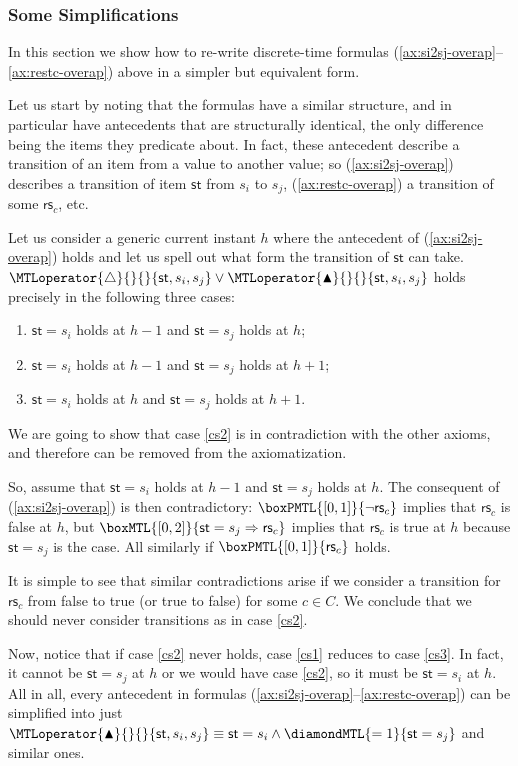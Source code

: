 \documentclass[a4paper]{article}
\newcommand{\frf}[1]{(\ref{#1})}
\newcommand{\fsrf}[2]{(\ref{#1}--\ref{#2})}
\newcommand{\st}{\mathsf{st}}
\newcommand{\rest}[1]{\mathsf{rs}_{#1}}
\newcommand{\becomesMTL}[1]{\MTLoperator{\triangle}{}{}{#1}}
\newcommand{\becomesOMTL}[1]{\MTLoperator{\blacktriangle}{}{}{#1}}
\theoremstyle{plain}
\theoremstyle{definition}
\begin{document}
\subsubsection{Some Simplifications}
In this section we show how to re-write discrete-time formulas \fsrf{ax:si2sj-overap}{ax:restc-overap} above in a simpler but equivalent form.

Let us start by noting that the formulas have a similar structure, and in particular have antecedents that are structurally identical, the only difference being the items they predicate about.
In fact, these antecedent describe a transition of an item from a value to another value; so \frf{ax:si2sj-overap} describes a transition of item $\st$ from $s_i$ to $s_j$, \frf{ax:restc-overap} a transition of some $\rest{c}$, etc.

Let us consider a generic current instant $h$ where the antecedent of \frf{ax:si2sj-overap} holds and let us spell out what form the transition of $\st$ can take.
$\becomesMTL{\st, s_i, s_j} \vee \becomesOMTL{\st, s_i, s_j}$ holds precisely in the following three cases:
\begin{enumerate}
  \item \label{cs2} $\st = s_i$ holds at $h-1$ and $\st = s_j$ holds at $h$;
  \item \label{cs1} $\st = s_i$ holds at $h-1$ and $\st = s_j$ holds at $h+1$;
  \item \label{cs3} $\st = s_i$ holds at $h$ and $\st = s_j$ holds at $h+1$.
\end{enumerate}
We are going to show that case \ref{cs2} is in contradiction with the other axioms, and therefore can be removed from the axiomatization.

So, assume that $\st = s_i$ holds at $h-1$ and $\st = s_j$ holds at $h$.
The consequent of \frf{ax:si2sj-overap} is then contradictory: $\boxPMTL{[0,1]}{\neg \rest{c}}$ implies that $\rest{c}$ is false at $h$, but $\boxMTL{[0,2]}{\st = s_j \Rightarrow \rest{c}}$ implies that $\rest{c}$ is true at $h$ because $\st = s_j$ is the case.
All similarly if $\boxPMTL{[0,1]}{\rest{c}}$ holds.

It is simple to see that similar contradictions arise if we consider a transition for $\rest{c}$ from false to true (or true to false) for some $c \in C$.
We conclude that we should never consider transitions as in case \ref{cs2}.

Now, notice that if case \ref{cs2} never holds, case \ref{cs1} reduces to case \ref{cs3}.
In fact, it cannot be $\st = s_j$ at $h$ or we would have case \ref{cs2}, so it must be $\st = s_i$ at $h$.
All in all, every antecedent in formulas \fsrf{ax:si2sj-overap}{ax:restc-overap} can be simplified into just $\becomesOMTL{\st, s_i, s_j} \equiv \st = s_i \wedge \diamondMTL{=1}{\st = s_j}$ and similar ones.
\end{document}
